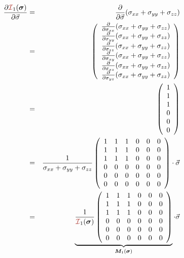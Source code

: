 \begin{eqnarray}
\frac{\partial {\III}_1(\bm\sigma)}{\partial \vec\sigma} 
&=& \frac{\partial }{\partial \vec\sigma} (\sigma_{xx}+\sigma_{yy}+\sigma_{zz})\nonumber\\
&=& \left(
\begin{array}{c}
\frac{\partial }{\partial \sigma_{xx}} (\sigma_{xx}+\sigma_{yy}+\sigma_{zz}) \\
\frac{\partial }{\partial \sigma_{yy}} (\sigma_{xx}+\sigma_{yy}+\sigma_{zz}) \\
\frac{\partial }{\partial \sigma_{zz}} (\sigma_{xx}+\sigma_{yy}+\sigma_{zz}) \\
\frac{\partial }{\partial \sigma_{xy}} (\sigma_{xx}+\sigma_{yy}+\sigma_{zz}) \\
\frac{\partial }{\partial \sigma_{xz}} (\sigma_{xx}+\sigma_{yy}+\sigma_{zz}) \\
\frac{\partial }{\partial \sigma_{yz}} (\sigma_{xx}+\sigma_{yy}+\sigma_{zz}) 
\end{array}
\right) \nonumber\\
&=& \left(
\begin{array}{c}
1 \\ 1 \\ 1 \\ 0 \\ 0 \\ 0 
\end{array}
\right) \nonumber\\
&=&
\frac{1}{\sigma_{xx}+\sigma_{yy}+\sigma_{zz}}
\left(
\begin{array}{cccccc}
1 & 1 & 1 & 0 & 0 & 0 \\
1 & 1 & 1 & 0 & 0 & 0 \\
1 & 1 & 1 & 0 & 0 & 0 \\
0 & 0 & 0 & 0 & 0 & 0 \\
0 & 0 & 0 & 0 & 0 & 0 \\
0 & 0 & 0 & 0 & 0 & 0 
\end{array}
\right) \cdot \vec\sigma \nonumber\\
&=&
\underbrace{
\frac{1}{{\III}_1(\bm\sigma)}
\left(
\begin{array}{cccccc}
1 & 1 & 1 & 0 & 0 & 0 \\
1 & 1 & 1 & 0 & 0 & 0 \\
1 & 1 & 1 & 0 & 0 & 0 \\
0 & 0 & 0 & 0 & 0 & 0 \\
0 & 0 & 0 & 0 & 0 & 0 \\
0 & 0 & 0 & 0 & 0 & 0 
\end{array}
\right)}_{{\bm M}_1(\bm\sigma)}
\cdot \vec\sigma
\end{eqnarray}


